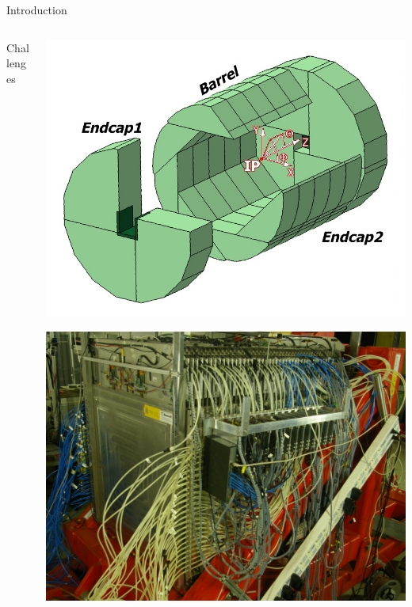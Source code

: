 \documentclass[10pt]{beamer}
\begin{document}
\begin{frame}[shrink=5]{Introduction}
\begin{columns}
\begin{column}{0.6\textwidth}
\begin{block}{\small  Challenges}
{        }
      \end{block}

    \end{column}

    \begin{column}{0.4\textwidth}
      \centerline{\includegraphics[height=0.45\textheight]{jpg/IldDhcal}}
      \centerline{\includegraphics[height=0.25\textheight]{jpg/m3Proto.jpg}}

\end{column}
\end{columns}
\end{frame}
\end{document}
